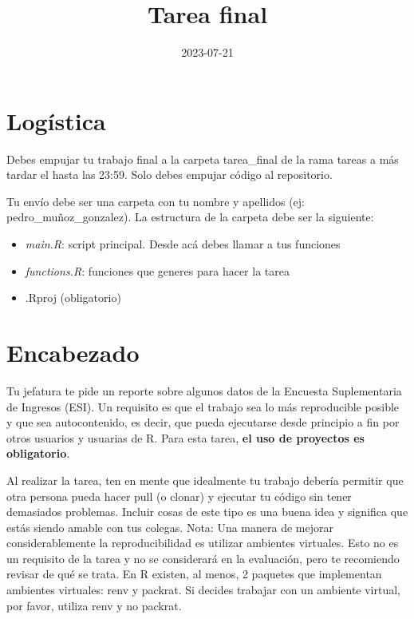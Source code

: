\documentclass[
]{article}
\title{Tarea final}
\author{}
\date{\vspace{-2.5em}2023-07-21}
\providecommand{\tightlist}{%
  \setlength{\itemsep}{0pt}\setlength{\parskip}{0pt}}
\begin{document}
\maketitle

\hypertarget{loguxedstica}{%
\section{Logística}\label{loguxedstica}}

Debes empujar tu trabajo final a la carpeta tarea\_final de la rama
tareas a más tardar el hasta las 23:59. Solo debes empujar código al
repositorio.

Tu envío debe ser una carpeta con tu nombre y apellidos (ej:
pedro\_muñoz\_gonzalez). La estructura de la carpeta debe ser la
siguiente:

\begin{itemize}
\tightlist
\item
  \emph{main.R}: script principal. Desde acá debes llamar a tus
  funciones
\item
  \emph{functions.R}: funciones que generes para hacer la tarea
\item
  .Rproj (obligatorio)
\end{itemize}

\hypertarget{encabezado}{%
\section{Encabezado}\label{encabezado}}

Tu jefatura te pide un reporte sobre algunos datos de la Encuesta
Suplementaria de Ingresos (ESI). Un requisito es que el trabajo sea lo
más reproducible posible y que sea autocontenido, es decir, que pueda
ejecutarse desde principio a fin por otros usuarios y usuarias de R.
Para esta tarea, \textbf{el uso de proyectos es obligatorio}.

Al realizar la tarea, ten en mente que idealmente tu trabajo debería
permitir que otra persona pueda hacer pull (o clonar) y ejecutar tu
código sin tener demasiados problemas. Incluir cosas de este tipo es una
buena idea y significa que estás siendo amable con tus colegas. Nota:
Una manera de mejorar considerablemente la reproducibilidad es utilizar
ambientes virtuales. Esto no es un requisito de la tarea y no se
considerará en la evaluación, pero te recomiendo revisar de qué se
trata. En R existen, al menos, 2 paquetes que implementan ambientes
virtuales: renv y packrat. Si decides trabajar con un ambiente virtual,
por favor, utiliza renv y no packrat.
\end{document}
